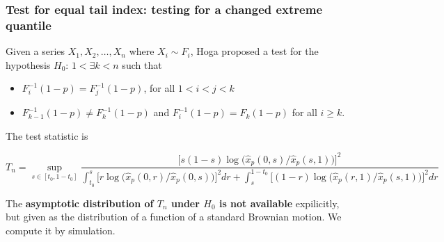 \documentclass{beamer}
\begin{document}
\begin{frame}
  \frametitle{\small Test for equal tail index: testing for a changed extreme
    quantile}
  Given a series $X_1, X_2, \dots, X_n$ where $X_i \sim F_i$, Hoga
  \cite{hoga:2016} proposed a test for the hypothesis $H_0$:
  $1 < \exists k < n$ such that
  \begin{itemize}
    \item $F_i^{-1}(1 - p) = F_j^{-1}(1 - p)$, for all $1 < i < j < k$
    \item $F_{k-1}^{-1}(1 - p) \neq F_k^{-1}(1 - p)$ and
      $F_i^{-1}(1-p) = F_k(1-p)$ for all $i \geq k$.
  \end{itemize}
  The test statistic is
  \begin{tiny}
  \[
  T_n = \sup_{s \in [t_0, 1 - t_0]}
  \dfrac{  \big[s (1 - s) \log \big(\hat x_p(0, s)/\hat x_p(s, 1)\big)
      \big]^2}{
    \int_{t_0}^s\big[r \log \big( \hat x_p(0, r)/\hat x_p(0, s)
      \big)
      \big]^2 dr
    +
    \int_{s}^{1 - t_0}
    \big[
      (1 - r) \log \big(
      \hat x_p(r, 1)/
      \hat x_p(s, 1)
      \big)
      \big]^2 dr}
  \]
  \end{tiny}
  The {\bf asymptotic distribution of $T_n$ under $H_0$ is not
    available} expilicitly, but given as the distribution of a
  function of a standard Brownian motion. We compute it by simulation.
\end{frame}
\end{document}
